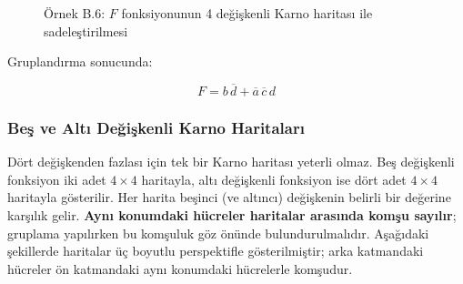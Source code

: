 \begin{ornek}[B.6]
\begin{figure}[H]
\caption*{Örnek B.6: $F$ fonksiyonunun 4 değişkenli Karno haritası ile sadeleştirilmesi}
\end{figure}

Gruplandırma sonucunda:

\[
    F = b\,\overline{d} + \overline{a}\,\overline{c}\,d
\]
\end{ornek}

\subsubsection{Beş ve Altı Değişkenli Karno Haritaları}

Dört değişkenden fazlası için tek bir Karno haritası yeterli olmaz. Beş değişkenli fonksiyon iki adet $4 \times 4$ haritayla, altı değişkenli fonksiyon ise dört adet $4 \times 4$ haritayla gösterilir. Her harita beşinci (ve altıncı) değişkenin belirli bir değerine karşılık gelir. \textbf{Aynı konumdaki hücreler haritalar arasında komşu sayılır}; gruplama yapılırken bu komşuluk göz önünde bulundurulmalıdır. Aşağıdaki şekillerde haritalar üç boyutlu perspektifle gösterilmiştir; arka katmandaki hücreler ön katmandaki aynı konumdaki hücrelerle komşudur.


